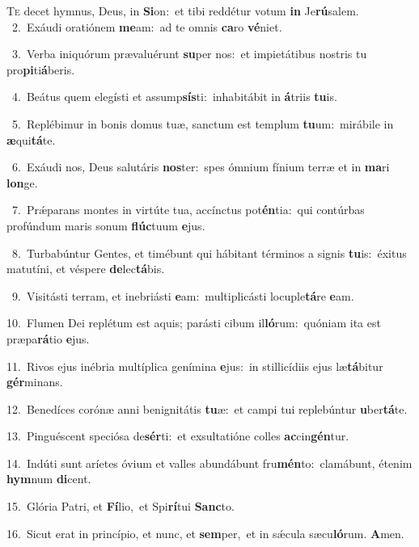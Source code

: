 \lettrine{\initial\textcolor{\initialcolor}{T}}{e} decet hymnus, Deus, in \textbf{Si}\-on:~\star et tibi reddétur votum \textbf{in} Je\-\textbf{rú}\-salem.\\
{\numbfont\textcolor{\numbcolor}{~2.}}~Exáudi oratiónem \textbf{me}\-am:~\star ad te omnis \textbf{ca}\-ro \textbf{vé}\-niet.\par
{\numbfont\textcolor{\numbcolor}{~3.}}~Verba iniquórum prævaluérunt \textbf{su}\-per nos:~\star et impietátibus nostris tu pro\-\textbf{pi}\-ti\-\textbf{á}\-beris.\par
{\numbfont\textcolor{\numbcolor}{~4.}}~Beátus quem elegísti et assump\-\textbf{sís}\-ti:~\star inhabitábit in \textbf{á}\-triis \textbf{tu}\-is.\par
{\numbfont\textcolor{\numbcolor}{~5.}}~Replébimur in bonis domus tuæ, sanctum est templum \textbf{tu}\-um:~\star mirábile in \textbf{æ}\-qui\-\textbf{tá}\-te.\par
{\numbfont\textcolor{\numbcolor}{~6.}}~Exáudi nos, Deus salutáris \textbf{nos}\-ter:~\star spes ómnium fínium terræ et in \textbf{ma}\-ri \textbf{lon}\-ge.\par
{\numbfont\textcolor{\numbcolor}{~7.}}~Prǽparans montes in virtúte tua, accínctus pot\-\textbf{én}\-tia:~\star qui contúrbas profúndum maris sonum \textbf{flúc}\-tuum \textbf{e}\-jus.\par
{\numbfont\textcolor{\numbcolor}{~8.}}~Turbabúntur Gentes, et timébunt qui hábitant términos a signis \textbf{tu}\-is:~\star éxitus matutíni, et véspere \textbf{de}\-lec\-\textbf{tá}\-bis.\par
{\numbfont\textcolor{\numbcolor}{~9.}}~Visitásti terram, et inebriásti \textbf{e}\-am:~\star multiplicásti locuple\-\textbf{tá}\-re \textbf{e}\-am.\par
{\numbfont\textcolor{\numbcolor}{10.}}~Flumen Dei replétum est aquis; parásti cibum il\-\textbf{ló}\-rum:~\star quóniam ita est præpa\-\textbf{rá}\-tio \textbf{e}\-jus.\par
{\numbfont\textcolor{\numbcolor}{11.}}~Rivos ejus inébria multíplica genímina \textbf{e}\-jus:~\star in stillicídiis ejus læ\-\textbf{tá}\-bitur \textbf{gér}\-minans.\par
{\numbfont\textcolor{\numbcolor}{12.}}~Benedíces corónæ anni benignitátis \textbf{tu}\-æ:~\star et campi tui replebúntur \textbf{u}\-ber\-\textbf{tá}\-te.\par
{\numbfont\textcolor{\numbcolor}{13.}}~Pinguéscent speciósa de\-\textbf{sér}\-ti:~\star et exsultatióne colles \textbf{ac}\-cin\-\textbf{gén}\-tur.\par
{\numbfont\textcolor{\numbcolor}{14.}}~Indúti sunt aríetes óvium et valles abundábunt fru\-\textbf{mén}\-to:~\star clamábunt, étenim \textbf{hym}\-num \textbf{di}\-cent.\par
{\numbfont\textcolor{\numbcolor}{15.}}~Glória Patri, et \textbf{Fí}\-lio,~\star et Spi\-\textbf{rí}\-tui \textbf{Sanc}\-to.\par
{\numbfont\textcolor{\numbcolor}{16.}}~Sicut erat in princípio, et nunc, et \textbf{sem}\-per,~\star et in sǽcula sæcu\-\textbf{ló}\-rum. \textbf{A}\-men.\par
